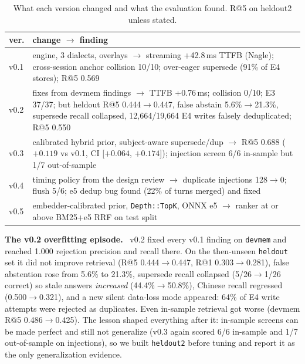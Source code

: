 \documentclass[10pt,twocolumn]{article}
\newcommand{\code}[1]{\texttt{\small #1}}
\newcommand{\para}[1]{\smallskip\noindent\textbf{#1}\ }
\begin{document}
\begin{table}[t]
\centering\scriptsize
\caption{What each version changed and what the evaluation found. R@5 on heldout2 unless stated.}
\label{tab:history}
\setlength{\tabcolsep}{2.5pt}
\begin{tabularx}{\columnwidth}{@{}l>{\raggedright\arraybackslash}X@{}}
\toprule
ver. & change $\to$ finding \\
\midrule
v0.1 & engine, 3 dialects, overlays $\to$ streaming +42.8\,ms TTFB (Nagle); cross-session anchor collision 10/10; over-eager supersede (91\% of E4 stores); R@5 0.569 \\
v0.2 & fixes from devmem findings $\to$ TTFB +0.76\,ms; collision 0/10; E3 37/37; but heldout R@5 0.444$\to$0.447, false abstain 5.6\%$\to$21.3\%, supersede recall collapsed, 12,664/19,664 E4 writes falsely deduplicated; R@5 0.550 \\
v0.3 & calibrated hybrid prior, subject-aware supersede/dup $\to$ R@5 0.688 ($+0.119$ vs v0.1, CI [$+0.064$, $+0.174$]); injection screen 6/6 in-sample but 1/7 out-of-sample \\
v0.4 & timing policy from the design review $\to$ duplicate injections 128$\to$0; flush 5/6; e5 dedup bug found (22\% of turns merged) and fixed \\
v0.5 & embedder-calibrated prior, \code{Depth::TopK}, ONNX e5 $\to$ ranker at or above BM25+e5 RRF on test split \\
\bottomrule
\end{tabularx}
\end{table}

\para{The v0.2 overfitting episode.} v0.2 fixed every v0.1 finding on \code{devmem} and reached 1.000 rejection precision
and recall there. On the then-unseen \code{heldout} set it did not improve retrieval (R@5 0.444$\to$0.447, R@1
0.303$\to$0.281), false abstention rose from 5.6\% to 21.3\%, supersede recall collapsed (5/26$\to$1/26 correct) so stale
answers \emph{increased} (44.4\%$\to$50.8\%), Chinese recall regressed (0.500$\to$0.321), and a new silent data-loss mode
appeared: 64\% of E4 write attempts were rejected as duplicates. Even in-sample retrieval got worse (devmem R@5
0.486$\to$0.425). The lesson shaped everything after it: in-sample screens can be made perfect and still not generalize
(v0.3 again scored 6/6 in-sample and 1/7 out-of-sample on injections), so we built \code{heldout2} before tuning and report
it as the only generalization evidence.
\end{document}
